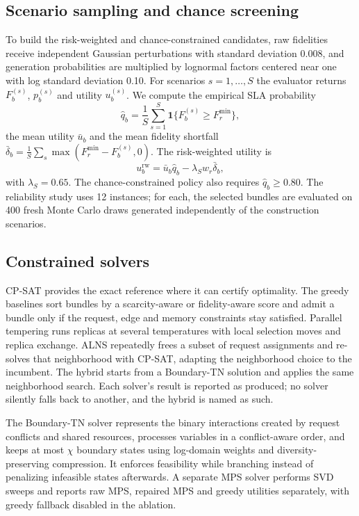 \documentclass[pdflatex,sn-nature]{sn-jnl}
\theoremstyle{plain}
\theoremstyle{remark}
\begin{document}
\subsection{Scenario sampling and chance screening}

To build the risk-weighted and chance-constrained candidates, raw fidelities receive independent Gaussian perturbations with standard deviation 0.008, and generation probabilities are multiplied by lognormal factors centered near one with log standard deviation 0.10. For scenarios $s=1,\ldots,S$ the evaluator returns $F_b^{(s)}$, $p_b^{(s)}$ and utility $u_b^{(s)}$. We compute the empirical SLA probability
\begin{equation}
\hat q_b=\frac{1}{S}\sum_{s=1}^S\mathbf{1}\{F_b^{(s)}\ge F_r^{\min}\},
\end{equation}
the mean utility $\bar u_b$ and the mean fidelity shortfall $\bar\delta_b=\frac1S\sum_s\max(F_r^{\min}-F_b^{(s)},0)$. The risk-weighted utility is
\begin{equation}
u_b^{\mathrm{rw}}=\bar u_b\hat q_b-\lambda_S w_r\bar\delta_b,
\end{equation}
with $\lambda_S=0.65$. The chance-constrained policy also requires $\hat q_b\ge0.80$. The reliability study uses 12 instances; for each, the selected bundles are evaluated on 400 fresh Monte Carlo draws generated independently of the construction scenarios.

\subsection{Constrained solvers}

CP-SAT provides the exact reference where it can certify optimality. The greedy baselines sort bundles by a scarcity-aware or fidelity-aware score and admit a bundle only if the request, edge and memory constraints stay satisfied. Parallel tempering runs replicas at several temperatures with local selection moves and replica exchange\cite{hukushima1996}. ALNS repeatedly frees a subset of request assignments and re-solves that neighborhood with CP-SAT, adapting the neighborhood choice to the incumbent. The hybrid starts from a Boundary-TN solution and applies the same neighborhood search. Each solver's result is reported as produced; no solver silently falls back to another, and the hybrid is named as such.

The Boundary-TN solver represents the binary interactions created by request conflicts and shared resources, processes variables in a conflict-aware order, and keeps at most $\chi$ boundary states using log-domain weights and diversity-preserving compression. It enforces feasibility while branching instead of penalizing infeasible states afterwards. A separate MPS solver performs SVD sweeps and reports raw MPS, repaired MPS and greedy utilities separately, with greedy fallback disabled in the ablation.
\end{document}
